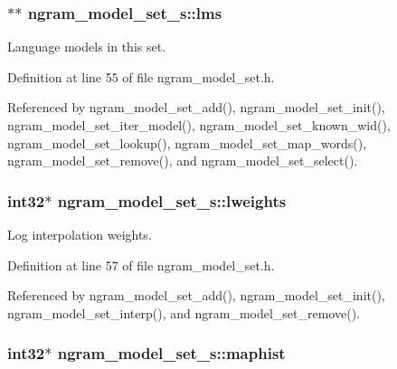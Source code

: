 \subsubsection[{lms}]{$\ast$$\ast$ ngram\+\_\+model\+\_\+set\+\_\+s\+::lms}\label{structngram__model__set__s_a862d4c4feb5a903101f4a0fdc5ba8a62}


Language models in this set. 



Definition at line 55 of file ngram\+\_\+model\+\_\+set.\+h.



Referenced by ngram\+\_\+model\+\_\+set\+\_\+add(), ngram\+\_\+model\+\_\+set\+\_\+init(), ngram\+\_\+model\+\_\+set\+\_\+iter\+\_\+model(), ngram\+\_\+model\+\_\+set\+\_\+known\+\_\+wid(), ngram\+\_\+model\+\_\+set\+\_\+lookup(), ngram\+\_\+model\+\_\+set\+\_\+map\+\_\+words(), ngram\+\_\+model\+\_\+set\+\_\+remove(), and ngram\+\_\+model\+\_\+set\+\_\+select().

\subsubsection[{lweights}]{\setlength{\rightskip}{0pt plus 5cm}int32$\ast$ ngram\+\_\+model\+\_\+set\+\_\+s\+::lweights}\label{structngram__model__set__s_a11068bb0029c788c506bec4507dd6d23}


Log interpolation weights. 



Definition at line 57 of file ngram\+\_\+model\+\_\+set.\+h.



Referenced by ngram\+\_\+model\+\_\+set\+\_\+add(), ngram\+\_\+model\+\_\+set\+\_\+init(), ngram\+\_\+model\+\_\+set\+\_\+interp(), and ngram\+\_\+model\+\_\+set\+\_\+remove().

\subsubsection[{maphist}]{\setlength{\rightskip}{0pt plus 5cm}int32$\ast$ ngram\+\_\+model\+\_\+set\+\_\+s\+::maphist}\label{structngram__model__set__s_af34ca232338c2d8c7dc8d13869ac09fd}



